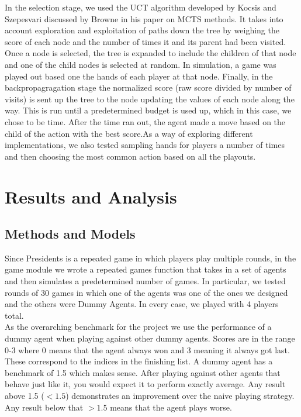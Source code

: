 \documentclass[11pt]{article}
\begin{document}
In the selection stage, we used the UCT algorithm developed by Kocsis and Szepesvari discussed by Browne in his paper on MCTS methods. It takes into account exploration and exploitation of paths down the tree by weighing the score of each node and the number of times it and its parent had been visited. Once a node is selected, the tree is expanded to include the children of that node and one of the child nodes is selected at random. In simulation, a game was played out based one the hands of each player at that node. Finally, in the backpropagragation stage the normalized score (raw score divided by number of visits) is sent up the tree to the node updating the values of each node along the way. This is run until a predetermined budget is used up, which in this case, we chose to be time. After the time ran out, the agent made a move based on the child of the action with the best score.As a way of exploring different implementations, we also tested sampling hands for players a number of times and then choosing the most common action based on all the playouts.


\section{Results and Analysis}



\subsection{Methods and Models}

Since Presidents is a repeated game in which players play multiple rounds, in the game module we wrote a repeated games function that takes in a set of agents and then simulates a predetermined number of games. In particular, we tested rounds of 30 games in which one of the agents was one of the ones we designed and the others were Dummy Agents. In every case, we played with 4 players total. \\

As the overarching benchmark for the project we use the performance of a dummy agent when playing against other dummy agents. Scores are in the range 0-3 where 0 means that the agent always won and 3 meaning it always got last. These correspond to the indices in the finishing list. A dummy agent has a benchmark of 1.5 which makes sense. After playing against other agents that behave just like it, you would expect it to perform exactly average. Any result above 1.5 ($<1.5$) demonstrates an improvement over the naive playing strategy. Any result below that $>1.5$ means that the agent plays worse.\\
\end{document}
